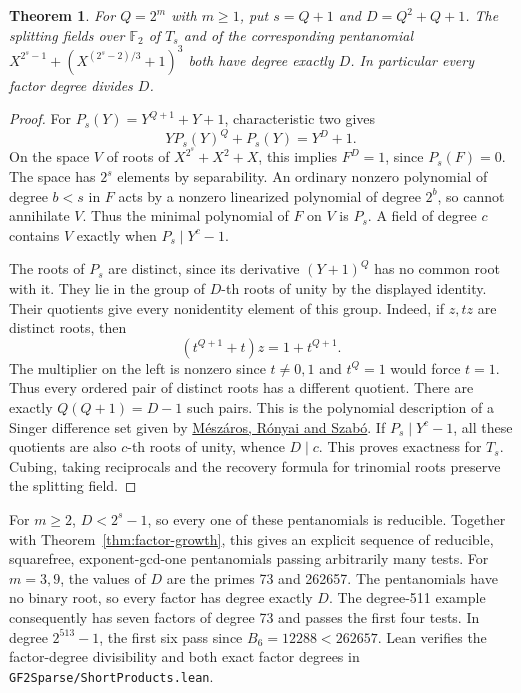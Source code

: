 \documentclass[11pt]{article}
\newtheorem{theorem}{Theorem}
\newcommand{\F}{\mathbb F_2}
\begin{document}
\begin{theorem}\label{thm:splitting-period}
For \(Q=2^m\) with \(m\ge1\), put \(s=Q+1\) and \(D=Q^2+Q+1\).
The splitting fields over \(\F\) of \(T_s\) and of the corresponding
pentanomial \(X^{2^s-1}+(X^{(2^s-2)/3}+1)^3\) both have degree
exactly \(D\). In particular every factor degree divides \(D\).
\end{theorem}
\begin{proof}
For \(P_s(Y)=Y^{Q+1}+Y+1\), characteristic two gives
\[
                 Y P_s(Y)^Q+P_s(Y)=Y^D+1 .
\]
On the space \(V\) of roots of \(X^{2^s}+X^2+X\), this implies
\(F^D=1\), since \(P_s(F)=0\). The space has \(2^s\) elements by
separability. An ordinary nonzero polynomial of degree \(b<s\) in
\(F\) acts by a nonzero linearized polynomial of degree \(2^b\),
so cannot annihilate \(V\). Thus the minimal polynomial of \(F\)
on \(V\) is \(P_s\). A field of degree \(c\) contains \(V\) exactly
when \(P_s\mid Y^c-1\).

The roots of \(P_s\) are distinct, since its derivative
\((Y+1)^Q\) has no common root with it. They lie in the group of
\(D\)-th roots of unity by the displayed identity. Their quotients
give every nonidentity element of this group. Indeed, if \(z,tz\)
are distinct roots, then
\[
                   (t^{Q+1}+t)z=1+t^{Q+1}.
\]
The multiplier on the left is nonzero since \(t\ne0,1\) and
\(t^Q=1\) would force \(t=1\). Thus every ordered pair of distinct
roots has a different quotient. There are exactly \(Q(Q+1)=D-1\)
such pairs. This is the polynomial description of a Singer
difference set given by
\href{https://page.mi.fu-berlin.de/szabo/PDF/singer.pdf}
{Mészáros, Rónyai and Szabó}.
If \(P_s\mid Y^c-1\), all these quotients are also \(c\)-th roots
of unity, whence \(D\mid c\). This proves exactness for \(T_s\).
Cubing, taking reciprocals and the recovery formula for trinomial
roots preserve the splitting field.
\end{proof}

For \(m\ge2\), \(D<2^s-1\), so every one of these pentanomials is
reducible. Together with Theorem~\ref{thm:factor-growth}, this gives
an explicit sequence of reducible, squarefree, exponent-gcd-one
pentanomials passing arbitrarily many tests. For \(m=3,9\), the
values of \(D\) are the primes 73 and 262657. The pentanomials have
no binary root, so every factor has degree exactly \(D\). The
degree-511 example consequently has seven factors of degree 73 and
passes the first four tests. In degree \(2^{513}-1\), the first six
pass since \(B_6=12288<262657\). Lean verifies the factor-degree
divisibility and both exact factor degrees in
\texttt{GF2Sparse/ShortProducts.lean}.
\end{document}
